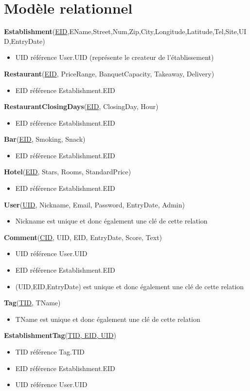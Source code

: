 \documentclass[11pt,a4paper]{report}
\begin{document}
\section*{Modèle relationnel}
\noindent
\textbf{Establishment}(\underline{EID},EName,Street,Num,Zip,City,Longitude,Latitude,Tel,Site,UID,EntryDate)
\begin{itemize}
\item UID référence User.UID (représente le createur de l'établissement)\\
\end{itemize}
\textbf{Restaurant}(\underline{EID}, PriceRange, BanquetCapacity, Takeaway, Delivery)
\begin{itemize}
\item EID référence Establishment.EID\\
\end{itemize} 
\textbf{RestaurantClosingDays}(\underline{EID}, ClosingDay, Hour)
\begin{itemize}
\item EID référence Establishment.EID\\
\end{itemize}
\textbf{Bar}(\underline{EID}, Smoking, Snack)
\begin{itemize}
\item EID référence Establishment.EID\\
\end{itemize}
\textbf{Hotel}(\underline{EID}, Stars, Rooms, StandardPrice)
\begin{itemize}
\item EID référence Establishment.EID\\
\end{itemize}
\textbf{User}(\underline{UID}, Nickname, Email, Password, EntryDate, Admin)
\begin{itemize}
\item Nickname est unique et donc également une clé de cette relation\\
\end{itemize}
\textbf{Comment}(\underline{CID}, UID, EID, EntryDate, Score,  Text)
\begin{itemize}
\item UID référence User.UID
\item EID référence Establishment.EID
\item (UID,EID,EntryDate) est unique et donc également une clé de cette relation\\
\end{itemize}
\textbf{Tag}(\underline{TID}, TName)
\begin{itemize}
\item TName est unique et donc également une clé de cette relation\\
\end{itemize}
\textbf{EstablishmentTag}(\underline{TID, EID, UID})
\begin{itemize}
\item TID référence Tag.TID
\item EID référence Establishment.EID
\item UID référence User.UID
\end{itemize}
\end{document}
